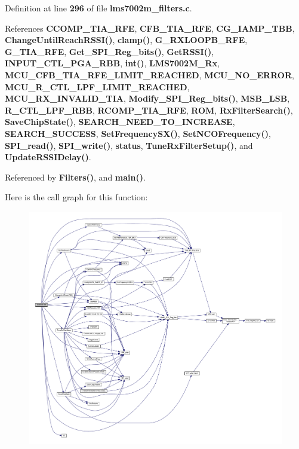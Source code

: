 Definition at line {\bf 296} of file {\bf lms7002m\+\_\+filters.\+c}.



References {\bf C\+C\+O\+M\+P\+\_\+\+T\+I\+A\+\_\+\+R\+FE}, {\bf C\+F\+B\+\_\+\+T\+I\+A\+\_\+\+R\+FE}, {\bf C\+G\+\_\+\+I\+A\+M\+P\+\_\+\+T\+BB}, {\bf Change\+Until\+Reach\+R\+S\+S\+I()}, {\bf clamp()}, {\bf G\+\_\+\+R\+X\+L\+O\+O\+P\+B\+\_\+\+R\+FE}, {\bf G\+\_\+\+T\+I\+A\+\_\+\+R\+FE}, {\bf Get\+\_\+\+S\+P\+I\+\_\+\+Reg\+\_\+bits()}, {\bf Get\+R\+S\+S\+I()}, {\bf I\+N\+P\+U\+T\+\_\+\+C\+T\+L\+\_\+\+P\+G\+A\+\_\+\+R\+BB}, {\bf int()}, {\bf L\+M\+S7002\+M\+\_\+\+Rx}, {\bf M\+C\+U\+\_\+\+C\+F\+B\+\_\+\+T\+I\+A\+\_\+\+R\+F\+E\+\_\+\+L\+I\+M\+I\+T\+\_\+\+R\+E\+A\+C\+H\+ED}, {\bf M\+C\+U\+\_\+\+N\+O\+\_\+\+E\+R\+R\+OR}, {\bf M\+C\+U\+\_\+\+R\+\_\+\+C\+T\+L\+\_\+\+L\+P\+F\+\_\+\+L\+I\+M\+I\+T\+\_\+\+R\+E\+A\+C\+H\+ED}, {\bf M\+C\+U\+\_\+\+R\+X\+\_\+\+I\+N\+V\+A\+L\+I\+D\+\_\+\+T\+IA}, {\bf Modify\+\_\+\+S\+P\+I\+\_\+\+Reg\+\_\+bits()}, {\bf M\+S\+B\+\_\+\+L\+SB}, {\bf R\+\_\+\+C\+T\+L\+\_\+\+L\+P\+F\+\_\+\+R\+BB}, {\bf R\+C\+O\+M\+P\+\_\+\+T\+I\+A\+\_\+\+R\+FE}, {\bf R\+OM}, {\bf Rx\+Filter\+Search()}, {\bf Save\+Chip\+State()}, {\bf S\+E\+A\+R\+C\+H\+\_\+\+N\+E\+E\+D\+\_\+\+T\+O\+\_\+\+I\+N\+C\+R\+E\+A\+SE}, {\bf S\+E\+A\+R\+C\+H\+\_\+\+S\+U\+C\+C\+E\+SS}, {\bf Set\+Frequency\+S\+X()}, {\bf Set\+N\+C\+O\+Frequency()}, {\bf S\+P\+I\+\_\+read()}, {\bf S\+P\+I\+\_\+write()}, {\bf status}, {\bf Tune\+Rx\+Filter\+Setup()}, and {\bf Update\+R\+S\+S\+I\+Delay()}.



Referenced by {\bf Filters()}, and {\bf main()}.



Here is the call graph for this function\+:
\nopagebreak
\begin{figure}[H]
\begin{center}
\leavevmode
\includegraphics[width=350pt]{d8/d1f/lms7002m__filters_8h_a9424d257383be4943c2846bb47253bf3_cgraph}
\end{center}
\end{figure}




